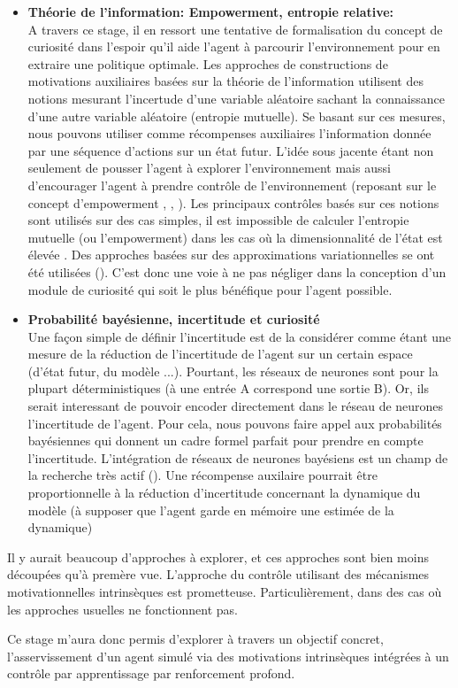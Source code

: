\begin{itemize}
\item \textbf{Théorie de l'information: Empowerment, entropie relative:}\\
    A travers ce stage, il en ressort une tentative de formalisation du concept de curiosité dans l'espoir qu'il aide l'agent à parcourir l'environnement pour en extraire une politique optimale. Les approches de constructions de motivations auxiliaires basées sur la théorie de l'information utilisent des notions mesurant l'incertude d'une variable aléatoire sachant la connaissance d'une autre variable aléatoire (entropie mutuelle). Se basant sur ces mesures, nous pouvons utiliser comme récompenses auxiliaires l'information donnée par une séquence d'actions sur un état futur. L'idée sous jacente étant non seulement de pousser l'agent à explorer l'environnement mais aussi d'encourager l'agent à prendre contrôle de l'environnement (reposant sur le concept d'empowerment \cite{empowerment}, \cite{empowerment2}, \cite{empowerment3}). Les principaux contrôles basés sur ces notions sont utilisés sur des cas simples, il est impossible de calculer l'entropie mutuelle (ou l'empowerment) dans les cas où la dimensionnalité de l'état est élevée . Des approches basées sur des approximations variationnelles se ont été utilisées (\cite{controleempowerment}). C'est donc une voie à ne pas négliger dans la conception d'un module de curiosité qui soit le plus bénéfique pour l'agent possible. 
\item \textbf{Probabilité bayésienne, incertitude et curiosité}\\
    Une façon simple de définir l'incertitude est de la considérer comme étant une mesure de la réduction de l'incertitude de l'agent sur un certain espace (d'état futur, du modèle ...). Pourtant, les réseaux de neurones sont pour la plupart déterministiques (à une entrée A correspond une sortie B). Or, ils serait interessant de pouvoir encoder directement dans le réseau de neurones l'incertitude de l'agent. Pour cela, nous pouvons faire appel aux probabilités bayésiennes qui donnent un cadre formel parfait pour prendre en compte l'incertitude. L'intégration de réseaux de neurones bayésiens est un champ de la recherche très actif (\cite{neuronebayes}). Une récompense auxilaire pourrait être proportionnelle à la réduction d'incertitude concernant la dynamique du modèle (à supposer que l'agent garde en mémoire une estimée de la dynamique) \cite{VIME}
\end{itemize}

Il y aurait beaucoup d'approches à explorer, et ces approches sont bien moins découpées qu'à premère vue. L'approche du contrôle utilisant des mécanismes motivationnelles intrinsèques est prometteuse. Particulièrement, dans des cas où les approches usuelles ne fonctionnent pas. 

Ce stage m'aura donc permis d'explorer à travers un objectif concret, l'asservissement d'un agent simulé via des motivations intrinsèques intégrées à un contrôle par apprentissage par renforcement profond.

